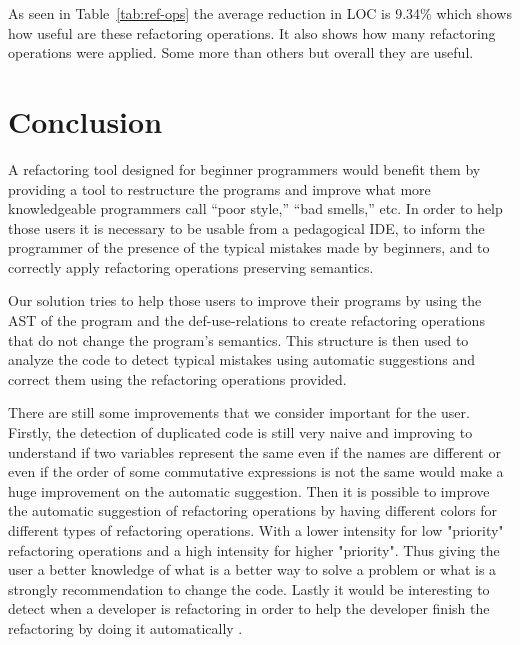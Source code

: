 As seen in Table~\ref{tab:ref-ops} the average reduction in LOC is 9.34\% which
shows how useful are these refactoring operations. It also shows how many
refactoring operations were applied. Some more than others but overall they are
useful. 


\section{Conclusion}
A refactoring tool designed for beginner programmers would benefit them
by providing a tool to restructure the programs and improve what more knowledgeable programmers call ``poor style,''
``bad smells,'' etc.
In order to help those users it is necessary to be usable from a pedagogical IDE,
to inform the programmer of the presence of the typical mistakes made by beginners, and
to correctly apply refactoring operations preserving semantics.

Our solution tries to help those users to improve their programs by using the AST of
the program and the def-use-relations to create refactoring operations that do not
change the program's semantics. This structure is then used to analyze the code
to detect typical mistakes using automatic suggestions and correct them using the
refactoring operations provided.


There are still some improvements that we consider important for the user.
Firstly, the detection of duplicated code is still very naive and improving to understand if
two variables represent the same even if the names are different or even if the
 order of some commutative expressions is not the same would make a huge improvement
 on the automatic suggestion.
Then it is possible to improve the automatic suggestion of refactoring operations by
having different colors for different types of refactoring operations.
With a lower intensity for low "priority" refactoring operations and a high intensity
for higher "priority". Thus giving the user a better knowledge of what is a better
way to solve a problem or what is a strongly recommendation to change the code.
Lastly it would be interesting to detect when a developer is refactoring in order to help the developer finish the
refactoring by doing it automatically \cite{ge2012reconciling}.
